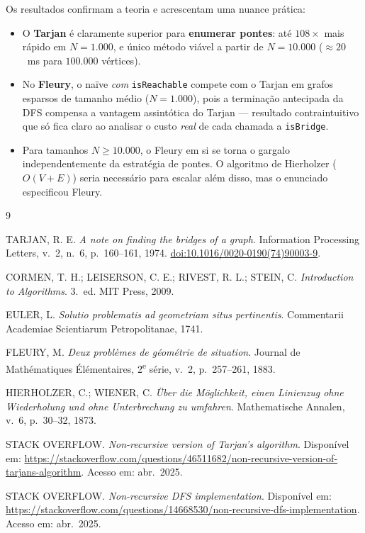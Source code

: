 \documentclass[12pt]{article}
\begin{document}
Os resultados confirmam a teoria e acrescentam uma nuance prática:

\begin{itemize}
    \item O \textbf{Tarjan} é claramente superior para \textbf{enumerar
          pontes}: até $108{\times}$ mais rápido em $N=1.000$, e único
          método viável a partir de $N=10.000$
          ($\approx 20$~ms para $100.000$ vértices).

    \item No \textbf{Fleury}, o naïve \emph{com} \texttt{isReachable}
          compete com o Tarjan em grafos esparsos de tamanho médio
          ($N=1.000$), pois a terminação antecipada da DFS compensa a
          vantagem assintótica do Tarjan --- resultado contraintuitivo que
          só fica claro ao analisar o custo \emph{real} de cada chamada
          a \texttt{isBridge}.

    \item Para tamanhos $N \ge 10.000$, o Fleury em si se torna o
          gargalo independentemente da estratégia de pontes. O algoritmo
          de Hierholzer ($O(V{+}E)$) seria necessário para escalar além
          disso, mas o enunciado especificou Fleury.
\end{itemize}

\begin{thebibliography}{9}

TARJAN, R. E.
\emph{A note on finding the bridges of a graph}.
Information Processing Letters, v.~2, n.~6, p.~160--161, 1974.
\href{https://doi.org/10.1016/0020-0190(74)90003-9}{doi:10.1016/0020-0190(74)90003-9}.

CORMEN, T. H.; LEISERSON, C. E.; RIVEST, R. L.; STEIN, C.
\emph{Introduction to Algorithms}. 3.~ed. MIT Press, 2009.

EULER, L.
\emph{Solutio problematis ad geometriam situs pertinentis}.
Commentarii Academiae Scientiarum Petropolitanae, 1741.

FLEURY, M.
\emph{Deux problèmes de géométrie de situation}.
Journal de Mathématiques Élémentaires, 2\textsuperscript{e} série, v.~2,
p.~257--261, 1883.

HIERHOLZER, C.; WIENER, C.
\emph{Über die Möglichkeit, einen Linienzug ohne Wiederholung und ohne
Unterbrechung zu umfahren}.
Mathematische Annalen, v.~6, p.~30--32, 1873.

STACK OVERFLOW.
\emph{Non-recursive version of Tarjan's algorithm}.
Disponível em:
\url{https://stackoverflow.com/questions/46511682/non-recursive-version-of-tarjans-algorithm}.
Acesso em: abr.~2025.

STACK OVERFLOW.
\emph{Non-recursive DFS implementation}.
Disponível em:
\url{https://stackoverflow.com/questions/14668530/non-recursive-dfs-implementation}.
Acesso em: abr.~2025.

\end{thebibliography}
\end{document}
